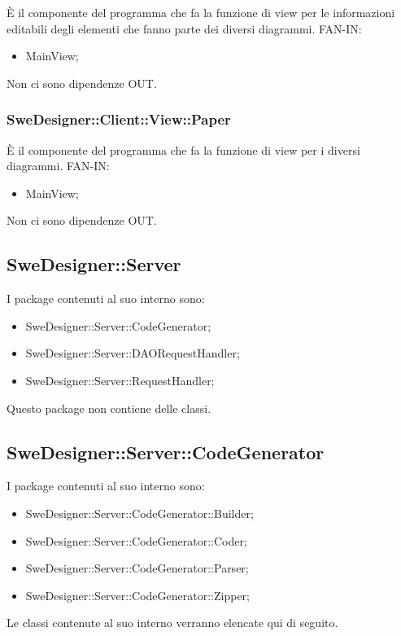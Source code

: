 \documentclass[../PianoDiQualifica.tex]{subfiles}
\begin{document}
		È il componente del programma che fa la funzione di view per le informazioni editabili degli elementi che fanno parte dei diversi diagrammi.
		FAN-IN:
		\begin{itemize}
			\item MainView;
		\end{itemize}
		Non ci sono dipendenze OUT.\subsubsection{SweDesigner::Client::View::Paper}
		È il componente del programma che fa la funzione di view per i diversi diagrammi.
		FAN-IN:
		\begin{itemize}
			\item MainView;
		\end{itemize}
		Non ci sono dipendenze OUT.\subsection{SweDesigner::Server}
		I package contenuti al suo interno sono:
		\begin{itemize}
			\item SweDesigner::Server::CodeGenerator;
			\item SweDesigner::Server::DAORequestHandler;
			\item SweDesigner::Server::RequestHandler;
		\end{itemize}
		Questo package non contiene delle classi.
		\subsection{SweDesigner::Server::CodeGenerator}
		I package contenuti al suo interno sono:
		\begin{itemize}
			\item SweDesigner::Server::CodeGenerator::Builder;
			\item SweDesigner::Server::CodeGenerator::Coder;
			\item SweDesigner::Server::CodeGenerator::Parser;
			\item SweDesigner::Server::CodeGenerator::Zipper;
		\end{itemize}
		Le classi contenute al suo interno verranno elencate qui di seguito.
\end{document}
